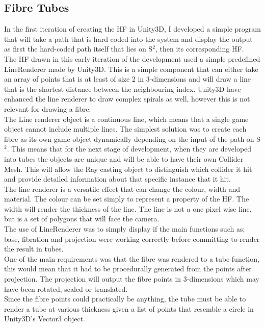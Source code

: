 \documentclass[12pt]{article} %
\begin{document}
\begin{flushleft}
\subsection{Fibre Tubes} %
In the first iteration of creating the HF in Unity3D, I developed a simple program that will take a path that is hard coded into the system and display the output as first the hard-coded path itself that lies on S$^{2}$, then its corresponding HF. \\
The HF drawn in this early iteration of the development used a simple predefined LineRenderer made by Unity3D. This is a simple component that can either take an array of points that is at least of size 2 in 3-dimensions and will draw a line that is the shortest distance between the neighbouring index. Unity3D have enhanced the line renderer to draw complex spirals as well, however this is not relevant for drawing a fibre. \\
 The Line renderer object is a continuous line, which means that a single game object cannot include multiple lines. The simplest solution was to create each fibre as its own game object dynamically depending on the input of the path on S$^{2}$. This means that for the next stage of development, when they are developed into tubes the objects are unique and will be able to have their own Collider Mesh. This will allow the Ray casting object to distinguish which collider it hit and provide detailed information about that specific instance that it hit.\\
The line renderer is a versatile effect that can change the colour, width and material. The colour can be set simply to represent a property of the HF. The width will render the thickness of the line. The line is not a one pixel wise line, but is a set of polygons that will face the camera. \\
The use of LineRenderer was to simply display if the main functions such as; base, fibration and projection were working correctly before committing to render the result in tubes.\\
One of the main requirements was that the fibre was rendered to a tube function, this would mean that it had to be procedurally generated from the points after projection. The projection will output the fibre points in 3-dimensions which may have been rotated, scaled or translated.\\
Since the fibre points could practically be anything, the tube must be able to render a tube at various thickness given a list of points that resemble a circle in Unity3D’s Vector3 object.\\

\end{flushleft}
\end{document}
